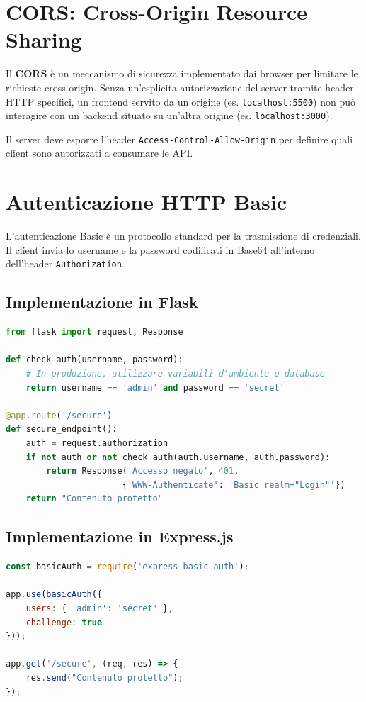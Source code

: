 \documentclass[11pt,a4paper]{report}
\begin{document}
\section{CORS: Cross-Origin Resource Sharing}
Il \textbf{CORS} è un meccanismo di sicurezza implementato dai browser per limitare le richieste cross-origin. Senza un'esplicita autorizzazione del server tramite header HTTP specifici, un frontend servito da un'origine (es. \texttt{localhost:5500}) non può interagire con un backend situato su un'altra origine (es. \texttt{localhost:3000}).

Il server deve esporre l'header \texttt{Access-Control-Allow-Origin} per definire quali client sono autorizzati a consumare le API.

\section{Autenticazione HTTP Basic}
L'autenticazione Basic è un protocollo standard per la trasmissione di credenziali. Il client invia lo username e la password codificati in Base64 all'interno dell'header \texttt{Authorization}.

\subsection*{Implementazione in Flask}
\begin{lstlisting}[language=python, caption=Basic Auth in Flask]
from flask import request, Response

def check_auth(username, password):
    # In produzione, utilizzare variabili d'ambiente o database
    return username == 'admin' and password == 'secret'

@app.route('/secure')
def secure_endpoint():
    auth = request.authorization
    if not auth or not check_auth(auth.username, auth.password):
        return Response('Accesso negato', 401, 
                       {'WWW-Authenticate': 'Basic realm="Login"'})
    return "Contenuto protetto"
\end{lstlisting}

\subsection*{Implementazione in Express.js}
\begin{lstlisting}[language=javascript, caption=Basic Auth in Express]
const basicAuth = require('express-basic-auth');

app.use(basicAuth({
    users: { 'admin': 'secret' },
    challenge: true
}));

app.get('/secure', (req, res) => {
    res.send("Contenuto protetto");
});
\end{lstlisting}
\end{document}
